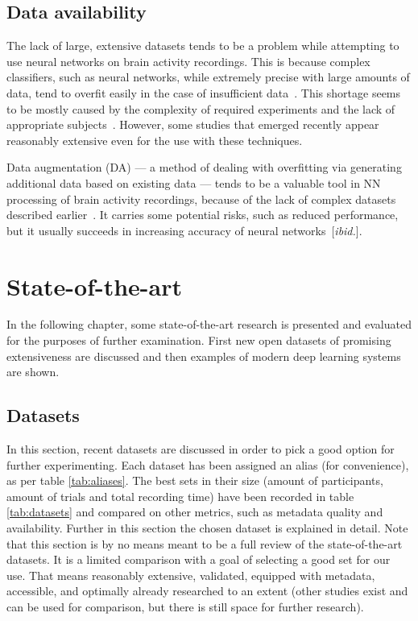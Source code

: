\documentclass[english, he, bc, kiv, iso690alph]{fasthesis}
\begin{document}
\section{Data availability}

The lack of large, extensive datasets tends to be a problem while attempting to use neural networks on brain activity recordings. This is because complex classifiers, such as neural networks, while extremely precise with large amounts of data, tend to overfit easily in the case of insufficient data~\cite{domingos:ml:12}. This shortage seems to be mostly caused by the complexity of required experiments and the lack of appropriate subjects~\cite{he:da:21}. However, some studies that emerged recently appear reasonably extensive even for the use with these techniques.

Data augmentation (DA) --- a method of dealing with overfitting via generating additional data based on existing data --- tends to be a valuable tool in NN processing of brain activity recordings, because of the lack of complex datasets described earlier~\cite{he:da:21}. It carries some potential risks, such as reduced performance, but it usually succeeds in increasing accuracy of neural networks~[\emph{ibid.}].


\chapter{State-of-the-art}


In the following chapter, some state-of-the-art research is presented and evaluated for the purposes of further examination. First new open datasets of promising extensiveness are discussed and then examples of modern deep learning systems are shown.

\section{Datasets}


In this section, recent datasets are discussed in order to pick a good option for further experimenting. Each dataset has been assigned an alias (for convenience), as per table \ref{tab:aliases}. The best sets in their size (amount of participants, amount of trials and total recording time) have been recorded in table \ref{tab:datasets} and compared on other metrics, such as metadata quality and availability. Further in this section the chosen dataset is explained in detail. Note that this section is by no means meant to be a full review of the state-of-the-art datasets. It is a limited comparison with a goal of selecting a good set for our use. That means reasonably extensive, validated, equipped with metadata, accessible, and optimally already researched to an extent (other studies exist and can be used for comparison, but there is still space for further research).
\end{document}
